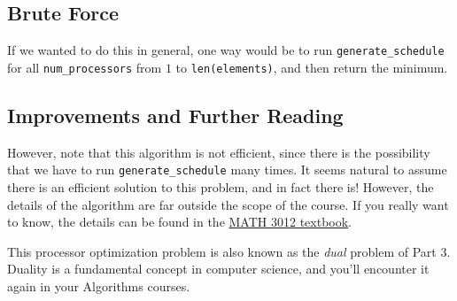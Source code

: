 \documentclass{article}
\begin{document}
    
    \subsection*{Brute Force}
    If we wanted to do this in general, one way would be to run \lstinline{generate_schedule} for all \lstinline{num_processors} from $1$ to \lstinline{len(elements)}, and then return the minimum.


    \subsection*{Improvements and Further Reading}
    \vspace{3mm}
    However, note that this algorithm is not efficient, since there is the possibility that we have to run \lstinline{generate_schedule} many times. It seems natural to assume there is an efficient solution to this problem, and in fact there is! However, the details of the algorithm are far outside the scope of the course. If you really want to know, the details can be found in the \href{https://www.appliedcombinatorics.org/book/s_flowapplications_chain-partition.html}{MATH 3012 textbook}.
    
    
    \vspace{3mm} This processor optimization problem is also known as the \textit{dual} problem of Part 3. Duality is a fundamental concept in computer science, and you'll encounter it again in your Algorithms courses.



    


\end{document}
